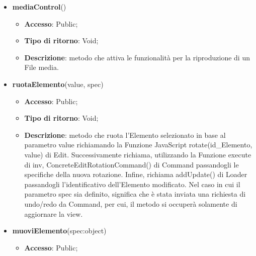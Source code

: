 {{\begin{itemize}
\begin{itemize}
				\item \textbf{Accesso}: Public;
				\item \textbf{Tipo di ritorno}: Void;
				\item \textbf{Descrizione}: metodo che cambia il contenuto dell'Elemento testo textId, in base al parametro textContent, e che successivamente, utilizzando la Funzione execute di inv, richiama ConcreteEditContentCommand() di Command passandogli le specifiche del testo modificato. Infine, richiama addUpdate() di Loader passandogli l'identificativo dell'Elemento testo modificato. Nel caso in cui il parametro spec sia definito, significa che è stata inviata una richiesta di undo/redo da Command, per cui, il metodo si occuperà solamente di aggiornare la view.
			\end{itemize}
			\item \textbf{mediaControl}()
			\begin{itemize}
				\item \textbf{Accesso}: Public;
				\item \textbf{Tipo di ritorno}: Void;
				\item \textbf{Descrizione}: metodo che attiva le funzionalità per la riproduzione di un File media.
			\end{itemize}
			\item \textbf{ruotaElemento}(value, spec)
			\begin{itemize}
				\item \textbf{Accesso}: Public;
				\item \textbf{Tipo di ritorno}: Void;
				\item \textbf{Descrizione}: metodo che ruota l'Elemento selezionato in base al parametro value richiamando la Funzione\ped{g} JavaScript rotate(id\_Elemento, value) di Edit. Successivamente richiama, utilizzando la Funzione execute di inv, ConcreteEditRotationCommand() di Command passandogli le specifiche della nuova rotazione. Infine, richiama addUpdate() di Loader passandogli l'identificativo dell'Elemento modificato. Nel caso in cui il parametro spec sia definito, significa che è stata inviata una richiesta di undo/redo da Command, per cui, il metodo si occuperà solamente di aggiornare la view.
			\end{itemize}
			\item \textbf{muoviElemento}(spec:object)
			\begin{itemize}
				\item \textbf{Accesso}: Public;

\end{itemize}
\end{itemize}}}
